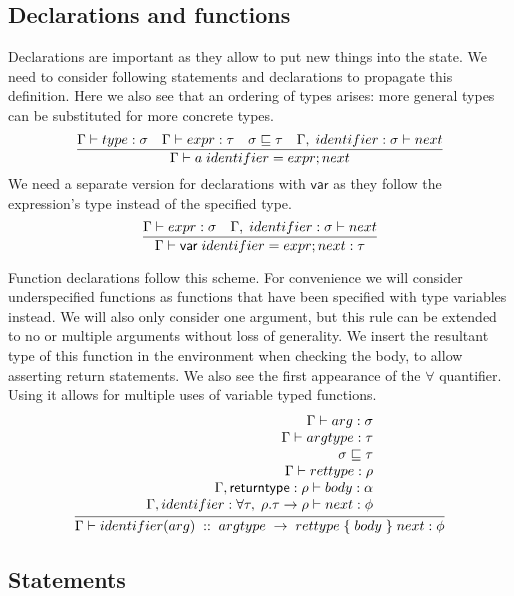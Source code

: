 \subsection{Declarations and functions}\label{sec:declarations}

Declarations are important as they allow to put new things into the state.
We need to consider following statements and declarations to propagate this definition.
Here we also see that an ordering of types arises: more general types can be substituted for more concrete types.
\[
    \infer{\Gamma \vdash a \; identifier = expr;next}{
        \Gamma \vdash type : \sigma &
        \Gamma \vdash expr : \tau &
        \sigma \sqsubseteq \tau &
        \Gamma,\; identifier : \sigma \vdash next
    }
\]
We need a separate version for declarations with $\mathsf{var}$ as they follow the expression's type instead of the specified type.
\[
    \infer{\Gamma \vdash \mathsf{var} \; identifier = expr;next : \tau}{
        \Gamma \vdash expr : \sigma &
        \Gamma,\; identifier : \sigma \vdash next
    }
\]

Function declarations follow this scheme. For convenience we will consider underspecified functions as functions that have been specified with type variables instead. We will also only consider one argument, but this rule can be extended to no or multiple arguments without loss of generality. We insert the resultant type of this function in the environment when checking the body, to allow asserting return statements.
We also see the first appearance of the $\forall$ quantifier.
Using it allows for multiple uses of variable typed functions.
\[
    \infer{\Gamma \vdash identifier(arg)\; ::\; argtype\; \to\; rettype\; \{\; body\; \}\; next : \phi}{
        \begin{array}{r}
            \Gamma \vdash arg : \sigma \\
            \Gamma \vdash argtype : \tau\\
            \sigma \sqsubseteq \tau \\
            \Gamma \vdash rettype : \rho \\
            \Gamma, \mathsf{returntype} : \rho \vdash body : \alpha \\
            \Gamma, identifier :\forall \tau,\;\rho. \tau \to \rho \vdash next : \phi
        \end{array}
    }
\]

\subsection{Statements}

